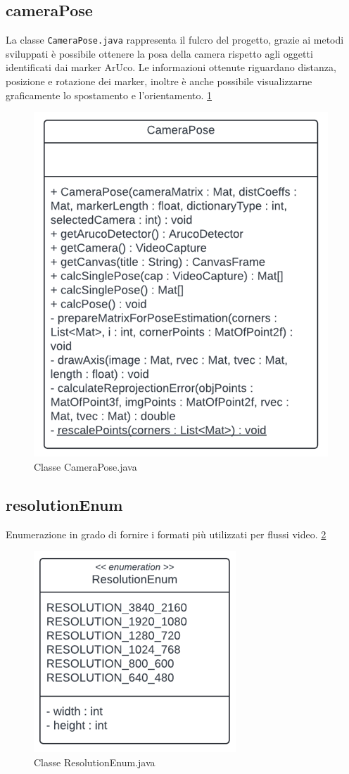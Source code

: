 \documentclass[12pt,a4paper,openright,twoside]{book}
\begin{document}
\subsection{cameraPose}
La classe \texttt{CameraPose.java} rappresenta il fulcro del progetto, grazie ai metodi sviluppati è possibile ottenere la posa della camera rispetto agli oggetti identificati dai marker ArUco. Le informazioni ottenute riguardano distanza, posizione e rotazione dei marker, inoltre è anche possibile visualizzarne graficamente lo spostamento e l'orientamento. \ref{fig:camera_pose}
\begin{figure}
	\centering
	\includegraphics[width=0.5\linewidth]{./figures/UML/cameraPose.png}
	\caption{Classe CameraPose.java}
	\label{fig:camera_pose}
\end{figure}
\subsection{resolutionEnum}
Enumerazione in grado di fornire i formati più utilizzati per flussi video. \ref{fig:resolution_enum}
\begin{figure}
	\centering
	\includegraphics[width=0.5\linewidth]{./figures/UML/resolutionEnum.png}
	\caption{Classe ResolutionEnum.java}
	\label{fig:resolution_enum}
\end{figure}
\end{document}
